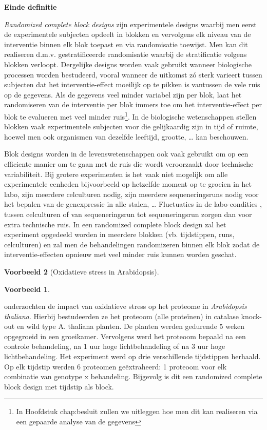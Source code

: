 \documentclass[
  12pt,dutch,coursenotes]{book}
\theoremstyle{definition}
\theoremstyle{definition}
\newtheorem{example}{Voorbeeld}[chapter]
\theoremstyle{definition}
\theoremstyle{remark}
\begin{document}
\textbf{Einde definitie}

\emph{Randomized complete block designs} zijn experimentele designs waarbij men eerst de experimentele subjecten opdeelt in blokken en vervolgens elk niveau van de interventie binnen elk blok toepast en via randomisatie toewijst. Men kan dit realiseren d.m.v. gestratificeerde randomisatie waarbij de stratificatie volgens blokken verloopt. Dergelijke designs worden vaak gebruikt wanneer biologische processen worden bestudeerd, vooral wanneer de uitkomst zó sterk varieert tussen subjecten dat het interventie-effect moeilijk op te pikken is vantussen de vele ruis op de gegevens. Als de gegevens veel minder variabel zijn per blok, laat het randomiseren van de interventie per blok immers toe om het interventie-effect per blok te evalueren met veel minder ruis\footnote{In Hoofdstuk chap:besluit zullen we uitleggen hoe men dit kan realiseren via een gepaarde analyse van de gegevens}. In de biologische wetenschappen stellen blokken vaak experimentele subjecten voor die gelijkaardig zijn in tijd of ruimte, hoewel men ook organismen van dezelfde leeftijd, grootte, \ldots{} kan beschouwen.

Blok designs worden in de levenswetenschappen ook vaak gebruikt om op een efficiente manier om te gaan met de ruis die wordt veroorzaakt door technische variabiliteit. Bij grotere experimenten is het vaak niet mogelijk om alle experimentele eenheden bijvoorbeeld op hetzelfde moment op te groeien in het labo, zijn meerdere celculturen nodig, zijn meerdere sequeneringsruns nodig voor het bepalen van de genexpressie in alle stalen, \ldots{} Fluctuaties in de labo-condities , tussen celculturen of van sequeneringsrun tot sequeneringsrun zorgen dan voor extra technische ruis. In een randomized complete block design zal het experiment opgedeeld worden in meerdere blokken (vb. tijdstippen, runs, celculturen) en zal men de behandelingen randomizeren binnen elk blok zodat de interventie-effecten opnieuw met veel minder ruis kunnen worden geschat.

\begin{example}[Oxidatieve stress in Arabidopsis]
\begin{example}

\protect\hypertarget{exm:unnamed-chunk-73}{}{\label{exm:unnamed-chunk-73} \iffalse (Oxidatieve stress in Arabidopsis) \fi{} }

\end{example}
\end{example}

\citet{Jacques2015} onderzochten de impact van oxidatieve stress op het proteome in \emph{Arabidopsis thaliana}. Hierbij bestudeerden ze het proteoom (alle proteïnen) in catalase knock-out en wild type A. thaliana planten. De planten werden gedurende 5 weken opgegroeid in een groeikamer. Vervolgens werd het proteoom bepaald na een controle behandeling, na 1 uur hoge lichtbehandeling of na 3 uur hoge lichtbehandeling. Het experiment werd op drie verschillende tijdstippen herhaald. Op elk tijdstip werden 6 proteomen geëxtraheerd: 1 proteoom voor elk combinatie van genotype x behandeling. Bijgevolg is dit een randomized complete block design met tijdstip als block.
\end{document}
